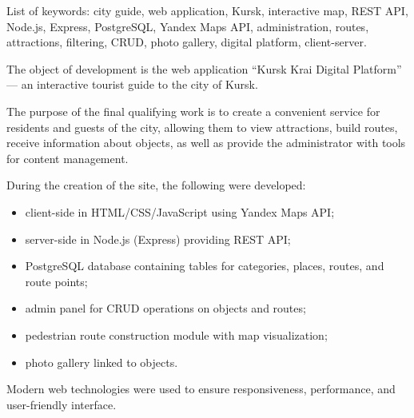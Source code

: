 List of keywords: city guide, web application, Kursk, interactive map, REST API, Node.js, Express, PostgreSQL, Yandex Maps API, administration, routes, attractions, filtering, CRUD, photo gallery, digital platform, client-server.

The object of development is the web application “Kursk Krai Digital Platform” — an interactive tourist guide to the city of Kursk.

The purpose of the final qualifying work is to create a convenient service for residents and guests of the city, allowing them to view attractions, build routes, receive information about objects, as well as provide the administrator with tools for content management.

During the creation of the site, the following were developed:
\begin{itemize}
	\item client-side in HTML/CSS/JavaScript using Yandex Maps API;
	\item server-side in Node.js (Express) providing REST API;
	\item PostgreSQL database containing tables for categories, places, routes, and route points;
	\item admin panel for CRUD operations on objects and routes;
	\item pedestrian route construction module with map visualization;
	\item photo gallery linked to objects.
\end{itemize}

Modern web technologies were used to ensure responsiveness, performance, and user-friendly interface.
